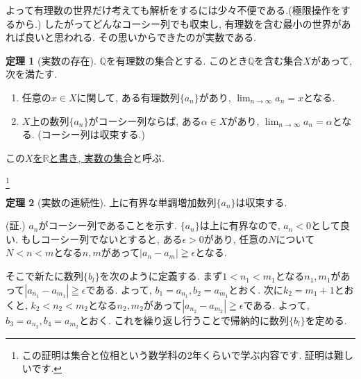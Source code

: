 \documentclass[dvipdfmx,a4paper,11pt]{article}
\newcommand{\R}{\mathbb{R}}
\newcommand{\Q}{\mathbb{Q}}
\newcommand{\N}{\mathbb{N}}
\theoremstyle{definition}
\newtheorem{thm}{定理}
\begin{document}
よって有理数の世界だけ考えても解析をするには少々不便である.(極限操作をするから.)
したがってどんなコーシー列でも収束し, 有理数を含む最小の世界があれば良いと思われる.
その思いからできたのが実数である.

\begin{tcolorbox}[
    colback = white,
    colframe = green!35!black,
    fonttitle = \bfseries,
    breakable = true]
    \begin{thm}[実数の存在]
 $\Q$を有理数の集合とする.
このとき$\Q$を含む集合$X$があって, 次を満たす.
\begin{enumerate}
\item 任意の$x \in X$に関して, ある有理数列$\{ a_n\}$があり, $\lim_{n \rightarrow \infty} a_n = x$となる.
\item $X$上の数列$\{ a_n\}$がコーシー列ならば, ある$\alpha  \in X$があり, $\lim_{n \rightarrow \infty} a_n = \alpha$となる. (コーシー列は収束する.)
\end{enumerate}

この\underline{$X$を$\R$と書き, 実数の集合}と呼ぶ.


 \end{thm}
 \end{tcolorbox}
 \footnote{この証明は集合と位相という数学科の2年くらいで学ぶ内容です. 証明は難しいです.}


 \begin{tcolorbox}[
    colback = white,
    colframe = green!35!black,
    fonttitle = \bfseries,
    breakable = true]
    \begin{thm}[実数の連続性]
上に有界な単調増加数列$\{a_n\}$は収束する.

 \end{thm}
 \end{tcolorbox}
 
  \hspace{-18pt}(証.) 
$a_n$がコーシー列であることを示す.
$\{ a_n \}$は上に有界なので, $a_n<0$として良い.
もしコーシー列でないとすると, ある$\epsilon>0$があり, 任意の$N$について$N<n<m$となる$n,m$があって$|a_n - a_m| \geqq \epsilon $となる.

そこで新たに数列$\{b_l\}$を次のように定義する.
まず$1<n_1<m_1$となる$n_1,m_1$があって$|a_{n_1} - a_{m_1}| \geqq \epsilon $である.
よって, $b_1 = a_{n_1}, b_2 = a_{m_1}$とおく.
次に$k_2 = m_{1}+1$とおくと,
$k_2<n_2<m_2$となる$n_2,m_2$があって$|a_{n_2} - a_{m_2}| \geqq \epsilon $である.
よって, $b_3 = a_{n_2}, b_4 = a_{m_2}$とおく.
これを繰り返し行うことで帰納的に数列$\{b_l\}$を定める.
\end{document}
